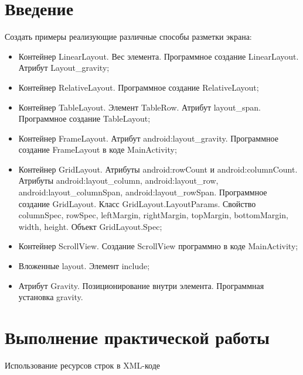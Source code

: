 \graphicspath{{./fourth/img}}

\section*{\LARGE{Введение}}
Создать примеры реализующие различные способы разметки экрана: 
\begin{itemize}
	\item Контейнер LinearLayout. Вес элемента. Программное создание 
		LinearLayout. Атрибут Layout\_gravity;
	\item Контейнер RelativeLayout. Программное создание RelativeLayout;
	\item Контейнер TableLayout. Элемент TableRow. Атрибут layout\_span. 
		Программное создание TableLayout;
	\item Контейнер FrameLayout. Атрибут android:layout\_gravity. 
		Программное создание FrameLayout в коде MainActivity;
	\item Контейнер GridLayout. Атрибуты android:rowCount и 
		android:columnCount. Атрибуты android:layout\_column,
		android:layout\_row, android:layout\_columnSpan,
		android:layout\_rowSpan.
		Программное создание GridLayout. Класс GridLayout.LayoutParams.
		Свойство columnSpec, rowSpec, leftMargin, rightMargin, topMargin,
		bottomMargin, width, height. Объект GridLayout.Spec;
	\item Контейнер ScrollView. Создание ScrollView программно в коде 
		MainActivity;
	\item Вложенные layout. Элемент include;
	\item Атрибут Gravity. Позиционирование внутри элемента. 
		Программная установка gravity.
\end{itemize}

\clearpage

\section*{\LARGE{Выполнение практической работы}}

\begin{image}
	\caption{Использование ресурсов строк в XML-коде}
	\label{fig:xml:string}
\end{image}


